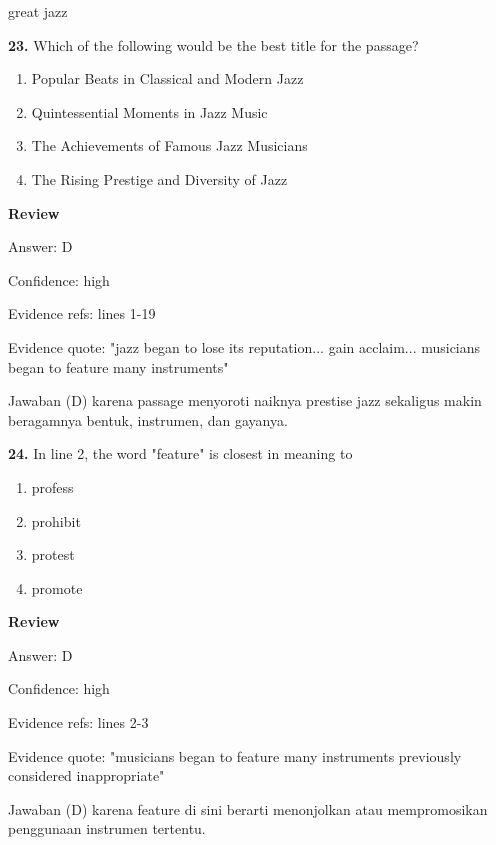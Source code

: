 \documentclass[12pt]{article}
\begin{document}
great jazz\par
\endgroup
\medskip
\noindent\textbf{23.} Which of the following would be the best title for the passage?
\begin{enumerate}[label=(\Alph*),leftmargin=*,itemsep=0.2em]
\item Popular Beats in Classical and Modern Jazz
\item Quintessential Moments in Jazz Music
\item The Achievements of Famous Jazz Musicians
\item The Rising Prestige and Diversity of Jazz
\end{enumerate}
\par
\begingroup
\setlength{\parskip}{0pt}
\setlength{\parindent}{0pt}
\textbf{Review}\par
Answer: D\par
Confidence: high\par
Evidence refs: lines 1-19\par
Evidence quote: "jazz began to lose its reputation... gain acclaim... musicians began to feature many instruments"\par
Jawaban (D) karena passage menyoroti naiknya prestise jazz sekaligus makin beragamnya bentuk, instrumen, dan gayanya.\par
\endgroup
\par
\vspace{0.25\baselineskip}
\noindent\textbf{24.} In line 2, the word "feature" is closest in meaning to
\begin{enumerate}[label=(\Alph*),leftmargin=*,itemsep=0.2em]
\item profess
\item prohibit
\item protest
\item promote
\end{enumerate}
\par
\begingroup
\setlength{\parskip}{0pt}
\setlength{\parindent}{0pt}
\textbf{Review}\par
Answer: D\par
Confidence: high\par
Evidence refs: lines 2-3\par
Evidence quote: "musicians began to feature many instruments previously considered inappropriate"\par
Jawaban (D) karena feature di sini berarti menonjolkan atau mempromosikan penggunaan instrumen tertentu.\par
\endgroup
\par
\end{document}
